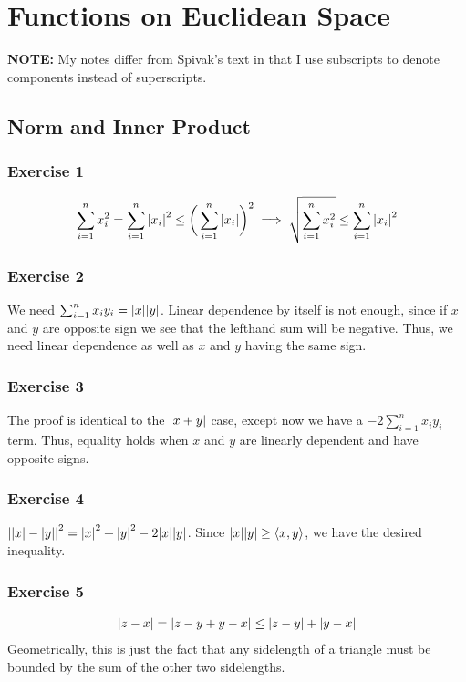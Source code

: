 \section{Functions on Euclidean Space}
\textbf{NOTE:} My notes differ from Spivak's text in that I use subscripts to denote
components instead of superscripts.

\subsection{Norm and Inner Product}

\subsubsection{Exercise 1}
\begin{align*}
        \sum_{i = 1}^n x_i^2  = \sum_{i = 1}^n \abs{x_i}^2 \leq \bigg(\sum_{i = 1}^n \abs{x_i}\bigg)^2 
        \implies \sqrt{\sum_{i = 1}^n x_i^2} \leq \sum_{i = 1}^n \abs{x_i}^2 
\end{align*}

\subsubsection{Exercise 2}
We need $\sum_{i = 1}^n x_i y_i = \abs{x} \abs{y}$. Linear dependence by itself is not enough, since if
$x$ and $y$ are opposite sign we see that the lefthand sum will be negative. Thus, we need linear dependence 
as well as $x$ and $y$ having the same sign.

\subsubsection{Exercise 3}
The proof is identical to the $\abs{x + y}$ case, except now we have a $-2 \sum_{i = 1}^n x_i y_i$ term.
Thus, equality holds when $x$ and $y$ are linearly dependent and have opposite signs.

\subsubsection{Exercise 4}
$\abs{\abs{x} - \abs{y}}^2 = \abs{x}^2 + \abs{y}^2 - 2\abs{x} \abs{y}$. Since $\abs{x} \abs{y} \geq \langle x, y \rangle$, we have the desired inequality.

\subsubsection{Exercise 5}
\begin{align*}
        \abs{z - x} = \abs{z - y + y - x} \leq \abs{z - y} + \abs{y - x}
\end{align*}
Geometrically, this is just the fact that any sidelength of a triangle must be bounded by the sum of the
other two sidelengths.

